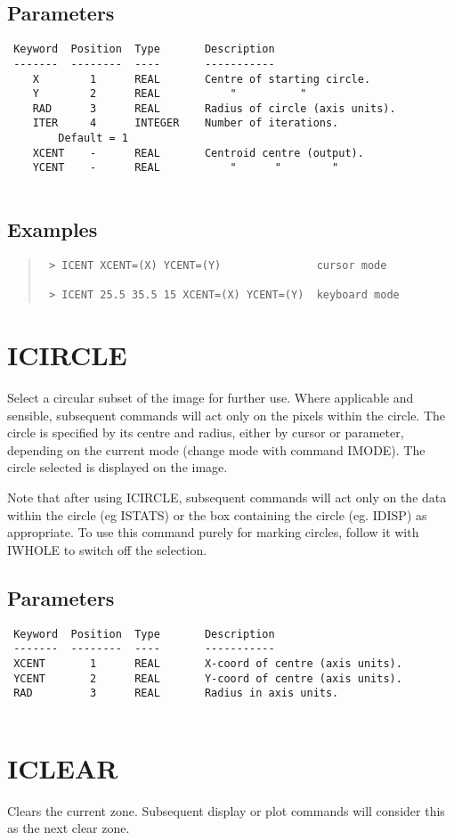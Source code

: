 \documentclass{book}
\renewcommand{\_}{{\tt\char'137}}     %
\begin{document}
\subsection{Parameters}
\begin{verbatim}
 Keyword  Position  Type       Description
 -------  --------  ----       -----------
    X        1      REAL       Centre of starting circle.
    Y        2      REAL           "          "
    RAD      3      REAL       Radius of circle (axis units).
    ITER     4      INTEGER    Number of iterations.
        Default = 1
    XCENT    -      REAL       Centroid centre (output).
    YCENT    -      REAL           "      "        "
 
\end{verbatim}\subsection{Examples}
\begin{quote}\begin{verbatim}
 > ICENT XCENT=(X) YCENT=(Y)               cursor mode
 
 > ICENT 25.5 35.5 15 XCENT=(X) YCENT=(Y)  keyboard mode
\end{verbatim}\end{quote}
\section{ICIRCLE}
Select a circular subset of the image for further use. Where
applicable and sensible, subsequent commands will act only on the
pixels within the circle. The circle is specified by its centre and
radius, either by cursor or parameter, depending on the current mode
(change mode with command IMODE). The circle selected is displayed
on the image.
 
Note that after using ICIRCLE, subsequent commands will act only
on the data within the circle (eg ISTATS) or the box containing
the circle (eg. IDISP) as appropriate. To use this command
purely for marking circles, follow it with IWHOLE to switch off
the selection.
 
\subsection{Parameters}
\begin{verbatim}
 Keyword  Position  Type       Description
 -------  --------  ----       -----------
 XCENT       1      REAL       X-coord of centre (axis units).
 YCENT       2      REAL       Y-coord of centre (axis units).
 RAD         3      REAL       Radius in axis units.
 
\end{verbatim}\section{ICLEAR}
Clears the current zone. Subsequent display or plot commands will
consider this as the next clear zone.
 
\end{document}
